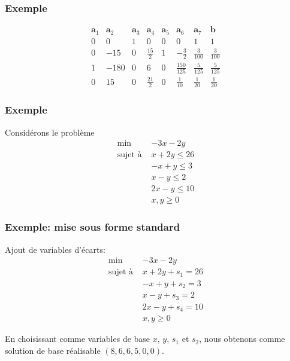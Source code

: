 \documentclass[t,usepdftitle=false]{beamer}
\def\ba{\boldsymbol{a}}
\def\bb{\boldsymbol{b}}
\begin{document}
\begin{frame}
\frametitle{Exemple}
	
	\[
	\begin{matrix}
		\ba_1 & \ba_2 & \ba_3 & \ba_4 & \ba_5 &\ba_6 &\ba_7 & \bb \\
		0 & 0 & 1 & 0 & 0 & 0 & 1 & 1 \\
		0 & -15 & 0 & \frac{15}{2} & 1 & -\frac{3}{2} & \frac{3}{100} & \frac{3}{100} \\
		1 & -180 & 0 & 6 & 0 & \frac{150}{125} & \frac{5}{125} & \frac{5}{125} \\
		0 & 15 & 0 & \frac{21}{2} & 0 & \frac{1}{10} & \frac{1}{20} & \frac{1}{20}
	\end{matrix}
	\]
	
\end{frame}

\begin{frame}
	\frametitle{Exemple}
	
	Considérons le problème
	\begin{align*}
		\min\ & -3x -2y \\
		\text{sujet à } & x + 2y \leq 26 \\
		& -x + y \leq 3 \\
		& x - y \leq 2 \\
		& 2x - y \leq 10 \\
		& x, y \geq 0
	\end{align*}
	
\end{frame}

\begin{frame}
	\frametitle{Exemple: mise sous forme standard}
	
	Ajout de variables d'écarts:
	\begin{align*}
		\min\ & -3x -2y \\
		\text{sujet à } & x + 2y + s_1 = 26 \\
		& -x + y + s_2 = 3 \\
		& x - y + s_3 = 2 \\
		& 2x - y + s_4 = 10 \\
		& x, y \geq 0
	\end{align*}
	
	En choisissant comme variables de base $x$, $y$, $s_1$ et $s_2$, nous obtenons comme solution de base réalisable $(8, 6, 6, 5, 0, 0)$.
	
\end{frame}
\end{document}

